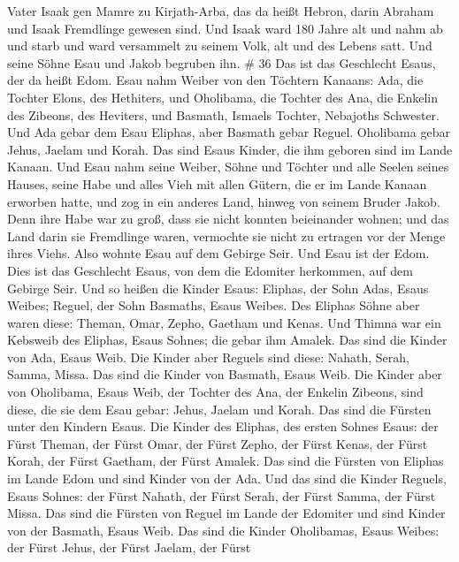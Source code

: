 Vater Isaak gen Mamre zu Kirjath-Arba, das da heißt Hebron, darin
Abraham und Isaak Fremdlinge gewesen sind.  Und Isaak ward
180 Jahre alt  und nahm ab und starb und ward versammelt zu
seinem Volk, alt und des Lebens satt. Und seine Söhne Esau und Jakob
begruben ihn. \# 36  Das ist das Geschlecht Esaus, der da
heißt Edom.  Esau nahm Weiber von den Töchtern Kanaans: Ada,
die Tochter Elons, des Hethiters, und Oholibama, die Tochter des Ana,
die Enkelin des Zibeons, des Heviters,  und Basmath, Ismaels
Tochter, Nebajoths Schwester.  Und Ada gebar dem Esau
Eliphas, aber Basmath gebar Reguel.  Oholibama gebar Jehus,
Jaelam und Korah. Das sind Esaus Kinder, die ihm geboren sind im Lande
Kanaan.  Und Esau nahm seine Weiber, Söhne und Töchter und
alle Seelen seines Hauses, seine Habe und alles Vieh mit allen Gütern,
die er im Lande Kanaan erworben hatte, und zog in ein anderes Land,
hinweg von seinem Bruder Jakob.  Denn ihre Habe war zu groß,
dass sie nicht konnten beieinander wohnen; und das Land darin sie
Fremdlinge waren, vermochte sie nicht zu ertragen vor der Menge ihres
Viehs.  Also wohnte Esau auf dem Gebirge Seir. Und Esau ist
der Edom.  Dies ist das Geschlecht Esaus, von dem die
Edomiter herkommen, auf dem Gebirge Seir.  Und so heißen
die Kinder Esaus: Eliphas, der Sohn Adas, Esaus Weibes; Reguel, der Sohn
Basmaths, Esaus Weibes.  Des Eliphas Söhne aber waren
diese: Theman, Omar, Zepho, Gaetham und Kenas.  Und Thimna
war ein Kebsweib des Eliphas, Esaus Sohnes; die gebar ihm Amalek. Das
sind die Kinder von Ada, Esaus Weib.  Die Kinder aber
Reguels sind diese: Nahath, Serah, Samma, Missa. Das sind die Kinder von
Basmath, Esaus Weib.  Die Kinder aber von Oholibama, Esaus
Weib, der Tochter des Ana, der Enkelin Zibeons, sind diese, die sie dem
Esau gebar: Jehus, Jaelam und Korah.  Das sind die Fürsten
unter den Kindern Esaus. Die Kinder des Eliphas, des ersten Sohnes
Esaus: der Fürst Theman, der Fürst Omar, der Fürst Zepho, der Fürst
Kenas,  der Fürst Korah, der Fürst Gaetham, der Fürst
Amalek. Das sind die Fürsten von Eliphas im Lande Edom und sind Kinder
von der Ada.  Und das sind die Kinder Reguels, Esaus
Sohnes: der Fürst Nahath, der Fürst Serah, der Fürst Samma, der Fürst
Missa. Das sind die Fürsten von Reguel im Lande der Edomiter und sind
Kinder von der Basmath, Esaus Weib.  Das sind die Kinder
Oholibamas, Esaus Weibes: der Fürst Jehus, der Fürst Jaelam, der Fürst
